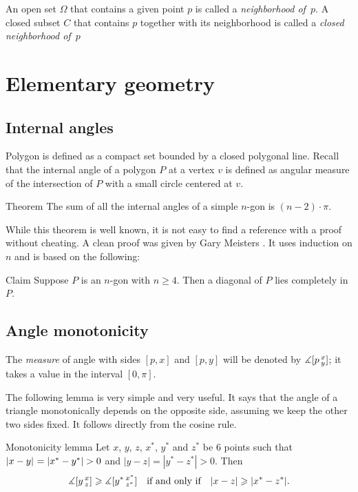 An open set $\Omega$ that contains a given point $p$ is called a \emph{neighborhood of~$p$}.
A closed subset $C$ that contains $p$ together with its neighborhood is called a {}\emph{closed neighborhood of~$p$}

\section{Elementary geometry}

\subsection*{Internal angles}

Polygon is defined as a compact set bounded by a closed polygonal line. 
Recall that the internal angle of a polygon $P$ at a vertex $v$
is defined as angular measure of the intersection of $P$ with a small circle centered at $v$.

\begin{thm}{Theorem}\label{thm:sum=(n-2)pi}
The sum of all the internal angles of a simple $n$-gon is $(n-2)\cdot\pi$. 
\end{thm}

While this theorem is well known, it is not easy to find a reference with a proof without cheating.
A clean proof was given by Gary Meisters \cite{meisters}.
It uses induction on $n$ and is based on the following:

\begin{thm}{Claim}
Suppose $P$ is an $n$-gon with $n\ge 4$.
Then a diagonal of $P$ lies completely in $P$.
\end{thm}



\subsection*{Angle monotonicity}

The \emph{measure} of angle with sides $[p,x]$ and $[p,y]$ will be denoted by $\measuredangle[p\,{}^{x}_{y}]$;
it takes a value in the interval $[0,\pi]$.

The following lemma is very simple and very useful.
It says that the angle of a triangle monotonically depends on the opposite side, assuming we keep the other two sides fixed.
It follows directly from the cosine rule.

\begin{thm}{Monotonicity lemma}\label{lem:angle-monotonicity}
Let $x$, $y$, $z$, $x^{*}$, $y^{*}$ and $z^{*}$ be 6 points such that $\dist{x}{y}{}\z=|x^{*}-y^{*}|>0$ and $|y-z|=|y^{*}-z^{*}|>0$.
Then 
\[\measuredangle[y\,{}^{x}_{z}]
\geqslant
\measuredangle[y^{*}\,{}^{x^{*}}_{z^{*}}]
\quad\text{if and only if}\quad
|x-z|\geqslant |x^{*}-z^{*}|.\]
\end{thm}

